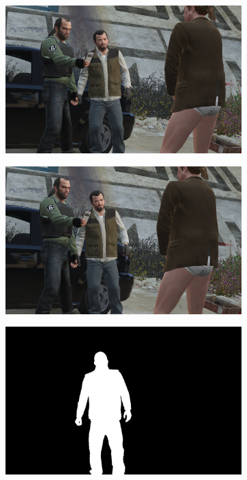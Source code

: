 \begin{figure}
\centering
\begin{subfigure}[t]{0.19\textwidth}
\centering
\includegraphics[scale=0.07]{good_examples/visual_179486_img.png}
\end{subfigure}
\begin{subfigure}[t]{0.19\textwidth}
\centering
\includegraphics[scale=0.07]{good_examples/visual_179486_img1.png}
\end{subfigure}
\begin{subfigure}[t]{0.19\textwidth}
\centering
\includegraphics[scale=0.07]{good_examples/visual_179486_gt.png}

\end{subfigure}
\end{figure}
